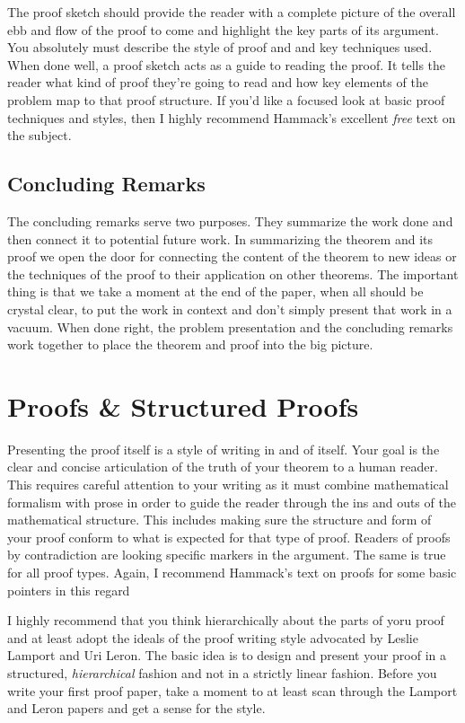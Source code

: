\documentclass{tufte-handout}
\begin{document}
The proof sketch should provide the reader with a complete picture of the overall ebb and flow of the proof to come and highlight the key parts of its argument. You absolutely must describe the style of proof and and key techniques used.  When done well, a proof sketch acts as a guide to reading the proof. It tells the reader what kind of proof they're going to read and how key elements of the problem map to that proof structure. If you'd like a focused look at basic proof techniques and styles, then I highly recommend Hammack's excellent \textit{free} text on the subject\cite{Hammack2013}.

\subsection{ Concluding Remarks }

The concluding remarks serve two purposes. They summarize the work done and then connect it to potential future work. In summarizing the theorem and its proof we open the door for connecting the content of the theorem to new ideas or the techniques of the proof to their application on other theorems. The important thing is that we take a moment at the end of the paper, when all should be crystal clear, to put the work in context and don't simply present that work in a vacuum. When done right, the problem presentation and the concluding remarks work together to place the theorem and proof into the big picture.

\section{Proofs \& Structured Proofs}

Presenting the proof itself is a style of writing in and of itself. Your goal is the clear and concise articulation of the truth of your theorem to a human reader. This requires careful attention to your writing as it must combine mathematical formalism with prose in order to guide the reader through the ins and outs of the mathematical structure. This includes making sure the structure and form of your proof conform to what is expected for that type of proof. Readers of proofs by contradiction are looking specific markers in the argument. The same is true for all proof types. Again, I recommend Hammack's text on proofs for some basic pointers in this regard\cite{Hammack2013}

I highly recommend that you think hierarchically about the parts of yoru proof and at least adopt the ideals of the proof writing style advocated by Leslie Lamport\cite{Lamport2012,Lamport1993} and Uri Leron\cite{Leron1983}. The basic idea is to design and present your proof in a structured, \textit{hierarchical} fashion and not in a strictly linear fashion. Before you write your first proof paper, take a moment to at least scan through the Lamport and Leron papers and get a sense for the style.
\end{document}
